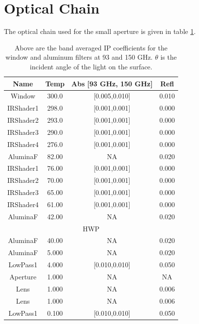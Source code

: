 \documentclass{article}
\theoremstyle{remark}
\begin{document}
\section{Optical Chain}
The optical chain used for the small aperture is given in table \ref{table:small_aperture_optical_chain}.



\begin{table}
\centering
\begin{tabular}{|c|c|c|c|}
\hline
Name & Temp & Abs [93 GHz, 150 GHz] & Refl \\
\hline
Window		& 300.0  & [0.005,0.010]	&0.010 \\
IRShader1	& 298.0  & [0.001,0.001]	&0.000 \\
IRShader2	& 293.0  & [0.001,0.001]	&0.000 \\
IRShader3	& 290.0  & [0.001,0.001]	&0.000 \\
IRShader4	& 276.0  & [0.001,0.001]	&0.000 \\
AluminaF	& 82.00  &  NA			   	&0.020 \\
IRShader1	& 76.00  & [0.001,0.001]	&0.000 \\
IRShader2	& 70.00  & [0.001,0.001]	&0.000 \\
IRShader3	& 65.00  & [0.001,0.001]	&0.000 \\
IRShader4	& 61.00  & [0.001,0.001]	&0.000 \\
AluminaF	& 42.00  &  NA			   	&0.020 \\
\hline
\multicolumn{4}{|c|}{HWP} \\
\hline
AluminaF	& 40.00  &  NA			   	&0.020 \\
AluminaF	& 5.000  &  NA			   	&0.020 \\
LowPass1	& 4.000  & [0.010,0.010]	&0.050 \\
Aperture	& 1.000  & NA	       		&NA	   \\
Lens		& 1.000  &  NA			   	&0.006 \\
Lens		& 1.000  &  NA			   	&0.006 \\
LowPass1	& 0.100  & [0.010,0.010]	&0.050 \\

\hline
\end{tabular}
\caption{ Above are the band averaged IP coefficients for the window and aluminum filters at 93 and 150 GHz. $\theta$ is the incident angle of the light
on the surface.
}
\label{table:small_aperture_optical_chain}
\end{table}
\end{document}
